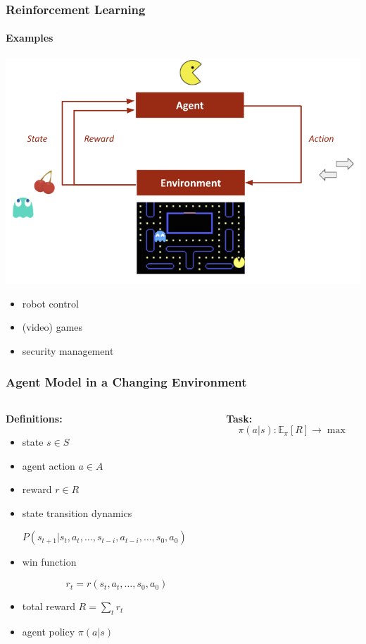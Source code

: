 \documentclass[fullscreen=true, bookmarks=true, hyperref={pdfencoding=unicode}]{beamer}
\begin{document}
\begin{frame}
  \frametitle{Reinforcement Learning}
    \framesubtitle{Examples}

  \begin{center}
    \includegraphics[keepaspectratio,
                     width=.7\paperwidth]{rl_scheme.png}
  \end{center}

  \begin{itemize}
    \pause
    \item robot control
    \pause
    \item (video) games
    \pause
    \item security management
  \end{itemize}
\end{frame}


\begin{frame}
  \frametitle{Agent Model in a Changing Environment}

   \begin{columns}
     \begin{column}{.6\paperwidth}
       {\bf Definitions:}
       \begin{itemize}
         \item state $s \in S$
         \item agent action $a \in A$
         \item reward $r \in R$
         \item state transition dynamics

          $ P(s_{t+1} | s_t, a_t, \dots, s_{t-i}, a_{t-i}, \dots, s_0, a_0) $
         \item win function

          $$ r_{t} = r(s_t, a_t, \dots, s_0, a_0)$$
         \item total reward $R = \sum\limits_t r_t$
         \item agent policy $\pi (a | s)$
       \end{itemize}
     \end{column}
     \begin{column}{.3\paperwidth}
       {\bf Task:}
       $$ \pi (a | s): \mathbb{E}_\pi [R] \to \max $$
     \end{column}
   \end{columns}
\end{frame}
\end{document}
